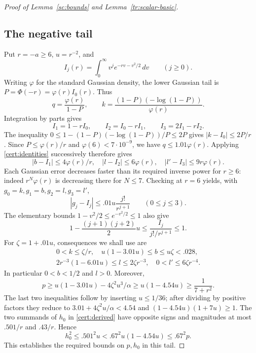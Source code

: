 \documentclass[11pt]{article}
\theoremstyle{definition}
\theoremstyle{remark}
\numberwithin{equation}{section}
\begin{document}
\begin{proof}[Proof of Lemma~\ref{sc:bounds} and Lemma~\ref{tr:scalar-basic}]
\subsection*{The negative tail}
Put $r=-a\ge6$, $u=r^{-2}$, and
\[
 I_j(r)=\int_0^\infty v^j e^{-rv-v^2/2}\,dv\qquad(j\ge0).
\]
Writing $\varphi$ for the standard Gaussian density, the lower Gaussian tail
is $P=\Phi(-r)=\varphi(r)I_0(r)$. Thus
\[
 q=\frac{\varphi(r)}{1-P},\qquad
 k=\frac{(1-P)(-\log(1-P))}{\varphi(r)}.
\]
Integration by parts gives
\[
 I_1=1-rI_0,\qquad I_2=I_0-rI_1,\qquad I_3=2I_1-rI_2.
\]
The inequality $0\le1-(1-P)(-\log(1-P))/P\le2P$ gives
$|k-I_0|\le2P/r$. Since $P\le\varphi(r)/r$ and
$\varphi(6)<7\cdot10^{-9}$, we have $q\le1.01\varphi(r)$.
Applying \eqref{cert:identities} successively therefore gives
\[
 |b-I_1|\le4\varphi(r)/r,\quad
 |l-I_2|\le6\varphi(r),\quad
 |l'-I_3|\le9r\varphi(r).
\]
Each Gaussian error decreases faster than its required inverse power for
$r\ge6$: indeed $r^N\varphi(r)$ is decreasing there for $N\le7$.
Checking at $r=6$ yields, with $g_0=k,g_1=b,g_2=l,g_3=l'$,
\begin{equation}\label{cert:left-errors}
 |g_j-I_j|\le .01u\frac{j!}{r^{j+1}}\qquad(0\le j\le3).
\end{equation}
The elementary bounds $1-v^2/2\le e^{-v^2/2}\le1$ also give
\begin{equation}\label{cert:integral-errors}
 1-\frac{(j+1)(j+2)}2u
 \le \frac{I_j}{j!/r^{j+1}}\le1.
\end{equation}
For $\zeta=1+.01u$, consequences we shall use are
\[
 \begin{array}{c}
 0<k\le\zeta/r,\quad
 u(1-3.01u)\le b\le u\zeta<.028,\\
 2r^{-3}(1-6.01u)\le l\le2\zeta r^{-3},\quad
 0<l'\le6\zeta r^{-4}.
 \end{array}
\]
In particular $0<b<1/2$ and $l>0$. Moreover,
\[
 p\ge u(1-3.01u)-4\zeta^2u^3/\alpha
       \ge u(1-4.54u)\ge\frac1{7+r^2}.
\]
The last two inequalities follow by inserting $u\le1/36$; after dividing
by positive factors they reduce to
$3.01+4\zeta^2u/\alpha<4.54$ and
$(1-4.54u)(1+7u)\ge1$.
The two summands of $h_0$ in \eqref{cert:derived} have opposite signs
and magnitudes at most $.501/r$ and $.43/r$. Hence
\[
 h_0^2\le .501^2u<.67^2u(1-4.54u)\le .67^2p.
\]
This establishes the required bounds on $p,h_0$ in this tail.


\end{proof}
\end{document}
